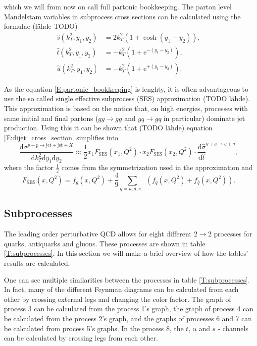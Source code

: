 \documentclass[a4paper, twoside, english, 12pt]{article}
\begin{document}
which we will from now on call full partonic bookkeeping. The parton level Mandelstam variables in subprocess cross sections can be calculated using the formulae (lähde TODO)
\begin{align}
\hat{s}(k_T^2,y_1,y_2) &= 2k_T^2(1+\cosh(y_1-y_2)), \label{E:Mandelstam_s}\\
\hat{t}(k_T^2,y_1,y_2) &= -k_T^2(1+\text{e}^{-(y_1-y_2)}),\label{E:Mandelstam_t}\\
\hat{u}(k_T^2,y_1,y_2) &=  -k_T^2(1+\text{e}^{+(y_1-y_2)}). \label{E:Mandelstam_u}
\end{align}

As the equation \eqref{E:partonic_bookkeeping} is lenghty, it is often advantageous to use the so called single effective subprocess (SES) approximation (TODO lähde). This approximation is based on the notice that, on high energies, processes with same initial and final partons ($gg\rightarrow gg$ and $gq\rightarrow gq$ in particular) dominate jet production. Using this it can be shown that (TODO lähde) equation \eqref{E:dijet_cross_section} simplifies into
\begin{equation}\label{E:dijet_cross_section_SES}
\frac{\text{d}\sigma^{p+p\rightarrow\text{jet}+\text{jet}+X}}{\text{d}k_T^2\text{d}y_1\text{d}y_2} \approx \frac{1}{2}x_1F_{\text{SES}}(x_1,Q^2)\cdot x_2F_{\text{SES}}(x_2,Q^2) \cdot\frac{\text{d}\hat{\sigma}}{\text{d}\hat{t}}^{g+g\rightarrow g+g},
\end{equation}
where the factor $\frac{1}{2}$ comes from the symmetrization used in the approximation and
\begin{equation}\label{E:F_SES}
	F_{\text{SES}}(x,Q^2) = f_g(x,Q^2) + \frac{4}{9} \sum\limits_{q=u,d,s\ldots }\left(f_q(x,Q^2)+f_{\bar{q}}(x,Q^2)\right).
\end{equation}


\subsection{Subprocesses}

The leading order perturbative QCD allows for eight different $2 \rightarrow 2$ processes for quarks, antiquarks and gluons. These processes are shown in table \ref{T:subprocesses}. In this section we will make a brief overview of how the tables' results are calculated.

One can see multiple similarities between the processes in table \ref{T:subprocesses}. In fact, many of the different Feynman diagrams can be calculated from each other by crossing external legs and changing the color factor. The graph of process 3 can be calculated from the process 1's graph, the graph of process 4 can be calculated from the process 2's graph, and the graphs of processes 6 and 7 can be calculated from process 5's graphs. In the process 8, the $t$, $u$ and $s$ - channels can be calculated by crossing legs from each other. 
\end{document}
